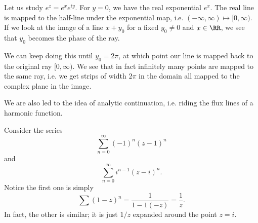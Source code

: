 \begin{exm}
    Let us study $e^z= e^x e^{iy}$. For $y=0$, we have the real exponential $e^x$. The real line is mapped to the half-line under the exponential map, i.e. $(-\infty,\infty) \mapsto [0,\infty)$. If we look at the image of a line $x+y_0$ for a fixed $y_0\neq 0$ and $x\in \RR$, we see that $y_0$ becomes the phase of the ray. %
    
    We can keep doing this until $y_0=2\pi$, at which point our line is mapped back to the original ray $[0,\infty)$. We see that in fact infinitely many points are mapped to the same ray, i.e. we get strips of width $2\pi$ in the domain all mapped to the complex plane in the image.
\end{exm}

We are also led to the idea of analytic continuation, i.e. riding the flux lines of a harmonic function.
\begin{exm}
    Consider the series
    \begin{equation}
        \sum_{n=0}^\infty (-1)^n (z-1)^n
    \end{equation}
    and
    \begin{equation}
        \sum_{n=0}^\infty i^{n-1}(z-i)^n.
    \end{equation}
    Notice the first one is simply
    \begin{equation}
        \sum(1-z)^n = \frac{1}{1-1(-z)} = \frac{1}{z}.
    \end{equation}
    In fact, the other is similar; it is just $1/z$ expanded around the point $z=i$.
\end{exm}
